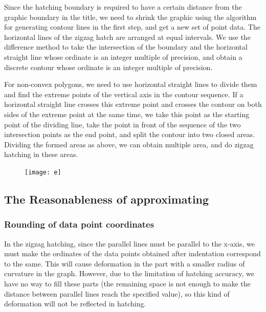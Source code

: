 \documentclass{apmcmthesis}
\begin{document}
Since the hatching boundary is required to have a certain distance from the graphic boundary in the title, we need to shrink the graphic using the algorithm for generating contour lines in the first step, and get a new set of point data. The horizontal lines of the zigzag hatch are arranged at equal intervals. We use the difference method to take the intersection of the boundary and the horizontal straight line whose ordinate is an integer multiple of precision, and obtain a discrete contour whose ordinate is an integer multiple of precision.


For non-convex polygons, we need to use horizontal straight lines to divide them and find the extreme points of the vertical axis in the contour sequence. If a horizontal straight line crosses this extreme point and crosses the contour on both sides of the extreme point at the same time, we take this point as the starting point of the dividing line, take the point in front of the sequence of the two intersection points as the end point, and split the contour into two closed areas. Dividing the formed areas as above, we can obtain multiple area, and do zigzag hatching in these areas.

\begin{figure}[!ht]
  \centering
  \texttt{[image: e]}
  \caption{}
\end{figure}


\subsection{The Reasonableness of approximating}


\subsubsection{Rounding of data point coordinates}
In the zigzag hatching, since the parallel lines must be parallel to the x-axis, we must make the ordinates of the data points obtained after indentation correspond to the same. This will cause deformation in the part with a smaller radius of curvature in the graph. However, due to the limitation of hatching accuracy, we have no way to fill these parts (the remaining space is not enough to make the distance between parallel lines reach the specified value), so this kind of deformation will not be reflected in hatching.
\end{document}
